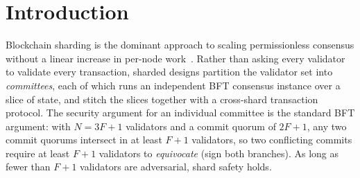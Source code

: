 \section{Introduction}
\label{sec:intro}

Blockchain sharding is the dominant approach to scaling permissionless consensus without a
linear increase in per-node work~\cite{luu2016elastico,kokoris2018omniledger,zamani2018rapidchain}.
Rather than asking every validator to validate every transaction, sharded designs partition the
validator set into \emph{committees}, each of which runs an independent BFT consensus instance
over a slice of state, and stitch the slices together with a cross-shard transaction protocol.
The security argument for an individual committee is the standard BFT argument: with $N=3F+1$
validators and a commit quorum of $2F+1$, any two commit quorums intersect in at least $F+1$
validators, so two conflicting commits require at least $F+1$ validators to \emph{equivocate}
(sign both branches). As long as fewer than $F+1$ validators are adversarial, shard safety holds.

